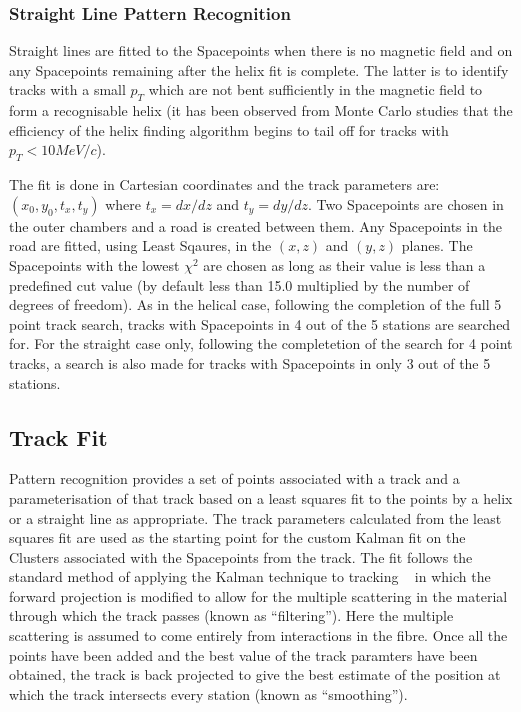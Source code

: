     \subsubsection{Straight Line Pattern Recognition}
    \label{subsubsec:StraightLinePatternRecognition}

    Straight lines are fitted to the Spacepoints when there is no magnetic field and on any Spacepoints remaining after the helix fit is complete. The latter is to identify tracks with a small $p_T$ which are not bent sufficiently in the magnetic field to form a recognisable helix (it has been observed from Monte Carlo studies that the efficiency of the helix finding algorithm begins to tail off for tracks with $p_T < 10 MeV/c$).

    The fit is done in Cartesian coordinates and the track parameters are: $(x_0, y_0, t_x, t_y)$ where $t_x = dx/dz$ and $t_y = dy/dz$. Two Spacepoints are chosen in the outer chambers and a road is created between them. Any Spacepoints in the road are fitted, using Least Sqaures, in the $(x,z)$ and $(y,z)$ planes. The Spacepoints with the lowest $\chi^2$ are chosen as long as their value is less than a predefined cut value (by default less than 15.0 multiplied by the number of degrees of freedom). As in the helical case, following the completion of the full 5 point track search, tracks with Spacepoints in 4 out of the 5 stations are searched for. For the straight case only, following the completetion of the search for 4 point tracks, a search is also made for tracks with Spacepoints in only 3 out of the 5 stations. 

   \subsection{Track Fit}
   \label{subsec:FinalTrackFit}
   Pattern recognition provides a set of points associated with a track and a parameterisation of that track based on a least squares fit to the points by a helix or a straight line as appropriate. The track parameters calculated from the least squares fit are used as the starting point for the custom Kalman fit on the Clusters associated with the Spacepoints from the track. The fit follows the standard method of applying the Kalman technique to tracking ~\cite{Fruhwirth,Billoir} in which the forward projection is modified to allow for the multiple scattering in the material through which the track passes (known as ``filtering''). Here the multiple scattering is assumed to come entirely from interactions in the fibre. Once all the points have been added and the best value of the track paramters have been obtained, the track is back projected to give the best estimate of the position at which the track intersects every station (known as ``smoothing'').

